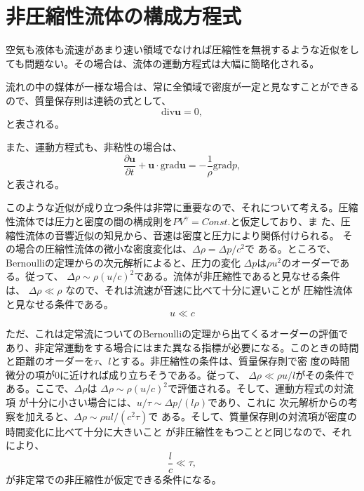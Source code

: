\section{非圧縮性流体の構成方程式}
空気も液体も流速があまり速い領域でなければ圧縮性を無視するような近似をし
ても問題ない。その場合は、流体の運動方程式は大幅に簡略化される。

流れの中の媒体が一様な場合は、常に全領域で密度が一定と見なすことができる
ので、質量保存則は連続の式として、
\begin{equation}
 \text{div}\bm{u} = 0,
\end{equation}
と表される。

また、運動方程式も、非粘性の場合は、
\begin{equation}
 \frac{\partial \bm{u}}{\partial t}
  + \bm{u} \cdot \text{grad} \bm{u} 
  = -\frac{1}{\rho}
  \text{grad}p,
\end{equation}
と表される。

このような近似が成り立つ条件は非常に重要なので、それについて考える。圧縮
性流体では圧力と密度の間の構成則を$PV^{\gamma}=Const.$と仮定しており、ま
た、圧縮性流体の音響近似の知見から、音速は密度と圧力により関係付けられる。
その場合の圧縮性流体の微小な密度変化は、$\Delta \rho = \Delta p / c^2$で
ある。ところで、Bernoulliの定理からの次元解析によると、圧力の変化
$\Delta p$は$\rho u^2$のオーダーである。従って、
$\Delta \rho \sim \rho (u/c)^2$である。流体が非圧縮性であると見なせる条件は、
$\Delta \rho \ll \rho$ なので、それは流速が音速に比べて十分に遅いことが
圧縮性流体と見なせる条件である。
\begin{equation}
 u \ll c
\end{equation}

ただ、これは定常流についてのBernoulliの定理から出てくるオーダーの評価で
あり、非定常運動をする場合にはまた異なる指標が必要になる。このときの時間
と距離のオーダーを$\tau$、$l$とする。非圧縮性の条件は、質量保存則で密
度の時間微分の項が0に近ければ成り立ちそうである。従って、
$\Delta \rho \ll \rho u / l$がその条件である。ここで、$\Delta \rho$は
$\Delta \rho \sim \rho (u/c)^2$で評価される。そして、運動方程式の対流項
が十分に小さい場合には、$u/\tau \sim \Delta p / (l \rho)$であり、これに
次元解析からの考察を加えると、$\Delta \rho \sim \rho u l / (c^2 \tau)$で
ある。そして、質量保存則の対流項が密度の時間変化に比べて十分に大きいこと
が非圧縮性をもつことと同じなので、それにより、
\begin{equation}
 \frac{l}{c} \ll \tau,
\end{equation}
が非定常での非圧縮性が仮定できる条件になる。

